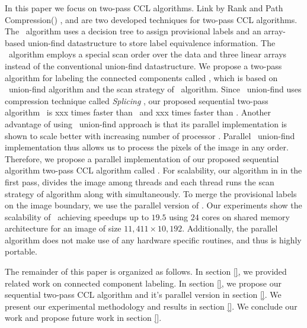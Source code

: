 In this paper we focus on two-pass CCL algorithms. Link by Rank and Path Compression(\lrpc) \cite{}, and \arun \cite{}
are two developed techniques for two-pass CCL algorithms.
The \lrpc\ algorithm uses a decision tree to assign provisional labels and an array-based union-find datastructure
to store label equivalence information. The \arun\ algorithm employs a special scan order over the data and three linear
arrays instead of the conventional union-find datastructure. 
We propose a two-pass algorithm for labeling the connected components called \aremsp, which is based on \rems\ union-find algorithm \cite{}
and the scan strategy of \arun\ algorithm. Since \rems\ union-find uses compression technique called {\em Splicing} \cite{},
our proposed sequential two-pass algorithm \aremsp\ is xxx times faster than \lrpc\ and xxx times faster than \arun.
Another advantage of using \rems\ union-find approach is that its parallel implementation is shown to scale better
with increasing number of processor \cite{Mostofa Multicore}. Parallel \rems\ union-find implementation thus allows us to
process the pixels of the image in any order. Therefore, we propose a parallel implementation of our proposed
sequential algorithm two-pass CCL algorithm called \paremsp. For scalability, our algorithm in in the first pass, divides the image among threads
and each thread runs the scan strategy of \arun algorithm along with \remsp simultaneously. To merge the provisional labels on the image boundary,
we use the parallel version of \remsp \cite{}. Our experiments show the scalability of \paremsp\ achieving speedups up to $19.5$ using $24$ cores
on shared memory architecture for an image of size $11,411 \times 10,192$.
Additionally, the parallel algorithm does not make use of any hardware specific routines, and thus is highly portable.

The remainder of this paper is organized as follows. In section \ref{}, we provided related work on connected component labeling.
In section \ref{}, we propose our sequential two-pass CCL algorithm \aremsp and it's parallel version in section \ref{}. We present our experimental
methodology and results in section \ref{}. We conclude our work
and propose future work in section \ref{}.


